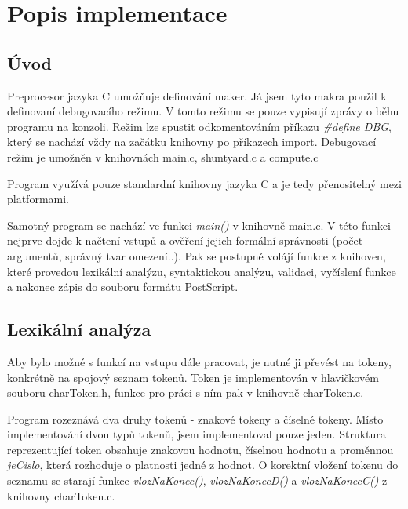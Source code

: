 \documentclass 	[a4paper,12pt]	{article}
\begin{document}
\section{Popis implementace}
\subsection{Úvod}
\label{subsec:uvod}
Preprocesor jazyka C umožňuje definování maker. Já jsem tyto makra použil k definovaní debugovacího režimu. V tomto režimu se pouze vypisují zprávy o běhu programu na konzoli. Režim lze spustit odkomentováním příkazu \emph{\#define DBG}, který se nachází vždy na začátku knihovny po příkazech import. Debugovací režim je umožněn v knihovnách main.c, shuntyard.c a compute.c

Program využívá pouze standardní knihovny jazyka C a je tedy přenositelný mezi platformami.

Samotný program se nachází ve funkci \emph{main()} v knihovně main.c. V této funkci nejprve dojde k načtení vstupů a ověření jejich formální správnosti (počet argumentů, správný tvar omezení..). Pak se postupně volájí funkce z knihoven, které provedou lexikální analýzu, syntaktickou analýzu, validaci, vyčíslení funkce a nakonec zápis do souboru formátu PostScript.  

\subsection{Lexikální analýza}
\label{subsec:lex_an}
Aby bylo možné s funkcí na vstupu dále pracovat, je nutné ji převést na tokeny, konkrétně na spojový seznam tokenů. Token je implementován v hlavičkovém souboru charToken.h, funkce pro práci s ním pak v knihovně charToken.c.

Program rozeznává dva druhy tokenů - znakové tokeny a číselné tokeny. Místo implementování dvou typů tokenů, jsem implementoval pouze jeden. Struktura reprezentující token obsahuje znakovou hodnotu, číselnou hodnotu a proměnnou \emph{jeCislo}, která rozhoduje o platnosti jedné z hodnot. O korektní vložení tokenu do seznamu se starají funkce \emph{vlozNaKonec()}, \emph{vlozNaKonecD()} a \emph{vlozNaKonecC()} z knihovny charToken.c.
\end{document}
